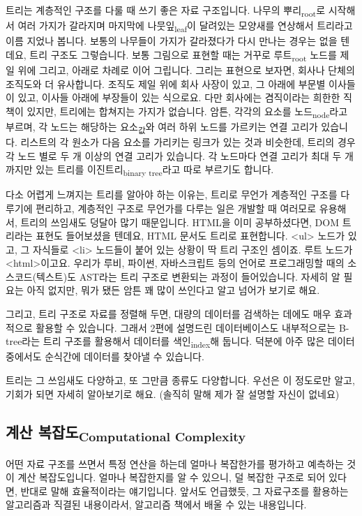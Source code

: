 \documentclass[11pt,a4paper]{article}
\newcommand{\sub}[1]{\textsubscript{#1}}
\begin{document}
트리는 계층적인 구조를 다룰 때 쓰기 좋은 자료 구조입니다. 나무의 뿌리\sub{root}로 시작해서 여러 가지가 갈라지며 마지막에 나뭇잎\sub{leaf}이 달려있는 모양새를 연상해서 트리라고 이름 지었나 봅니다. 보통의 나무들이 가지가 갈라졌다가 다시 만나는 경우는 없을 텐데요, 트리 구조도 그렇습니다. 보통 그림으로 표현할 때는 거꾸로 루트\sub{root} 노드를 제일 위에 그리고, 아래로 차례로 이어 그립니다. 그리는 표현으로 보자면, 회사나 단체의 조직도와 더 유사합니다. 조직도 제일 위에 회사 사장이 있고, 그 아래에 부문별 이사들이 있고, 이사들 아래에 부장들이 있는 식으로요. 다만 회사에는 겸직이라는 희한한 직책이 있지만, 트리에는 합쳐지는 가지가 없습니다. 암튼, 각각의 요소를 노드\sub{node}라고 부르며, 각 노드는 해당하는 요소\sub{값}와 여러 하위 노드를 가르키는 연결 고리가 있습니다. 리스트의 각 원소가 다음 요소를 가리키는 링크가 있는 것과 비슷한데, 트리의 경우 각 노드 별로 두 개 이상의 연결 고리가 있습니다. 각 노드마다 연결 고리가 최대 두 개까지만 있는 트리를 이진트리\sub{binary tree}라고 따로 부르기도 합니다.

다소 어렵게 느껴지는 트리를 알아야 하는 이유는, 트리로 무언가 계층적인 구조를 다루기에 편리하고, 계층적인 구조로 무언가를 다루는 일은 개발할 때 여러모로 유용해서, 트리의 쓰임새도 덩달아 많기 때문입니다. HTML을 이미 공부하셨다면, DOM 트리라는 표현도 들어보셨을 텐데요, HTML 문서도 트리로 표현합니다. \textsf{<ul>} 노드가 있고, 그 자식들로 \textsf{<li>} 노드들이 붙어 있는 상황이 딱 트리 구조인 셈이죠. 루트 노드가 \textsf{<html>}이고요. 우리가 루비, 파이썬, 자바스크립트 등의 언어로 프로그래밍할 때의 소스코드(텍스트)도 AST라는 트리 구조로 변환되는 과정이 들어있습니다. 자세히 알 필요는 아직 없지만, 뭐가 됐든 암튼 꽤 많이 쓰인다고 알고 넘어가 보기로 해요.

그리고, 트리 구조로 자료를 정렬해 두면, 대량의 데이터를 검색하는 데에도 매우 효과적으로 활용할 수 있습니다. 그래서 2편에 설명드린 데이터베이스도 내부적으로는 B-tree라는 트리 구조를 활용해서 데이터를 색인\sub{index}해 둡니다. 덕분에 아주 많은 데이터 중에서도 순식간에 데이터를 찾아낼 수 있습니다.

트리는 그 쓰임새도 다양하고, 또 그만큼 종류도 다양합니다. 우선은 이 정도로만 알고, 기회가 되면 자세히 알아보기로 해요. (솔직히 말해 제가 잘 설명할 자신이 없네요)

\subsection[계산복잡도]{계산 복잡도\sub{Computational Complexity}}

어떤 자료 구조를 쓰면서 특정 연산을 하는데 얼마나 복잡한가를 평가하고 예측하는 것이 \textsf{계산 복잡도}입니다. 얼마나 복잡한지를 알 수 있으니, 덜 복잡한 구조로 되어 있다면, 반대로 말해 효율적이라는 얘기입니다. 앞서도 언급했듯, 그 자료구조를 활용하는 알고리즘과 직결된 내용이라서, 알고리즘 책에서 배울 수 있는 내용입니다.
\end{document}
